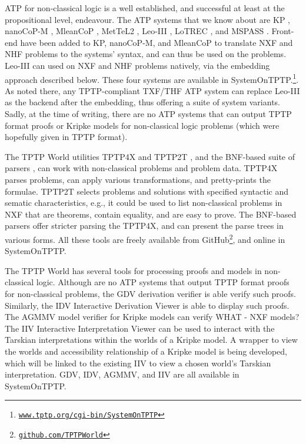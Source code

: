 \documentclass[runningheads]{llncs}
\begin{document}
ATP for non-classical logic is a well established, and successful at least at the propositional
level, endeavour.
The ATP systems that we know about are
K\raisebox{-3pt}{S}P \cite{NHD20,PN+21}, nanoCoP-M \cite{Ott21}, MleanCoP \cite{Ott14}, 
MetTeL2 \cite{TSK12}, Leo-III \cite{SB21}, LoTREC \cite{FF+01}, and MSPASS \cite{HS00-TABLEAUX}.
Front-end have been added to K\raisebox{-3pt}{S}P, nanoCoP-M, and MleanCoP to translate NXF
and NHF problems to the systems' syntax, and can thus be used on the problems.
Leo-III can used on NXF and NHF problems natively, via the embedding approach described below.
These four systems are available in SystemOnTPTP.\footnote{%
\href{https://www.tptp.org/cgi-bin/SystemOnTPTP}{\tt www.tptp.org/cgi-bin/SystemOnTPTP}}.
As noted there, any TPTP-compliant TXF/THF ATP system can replace Leo-III as the backend after
the embedding, thus offering a suite of system variants.
Sadly, at the time of writing, there are no ATP systems that can output TPTP format proofs or 
Kripke models for non-classical logic problems (which were hopefully given in TPTP format).

The TPTP World utilities TPTP4X and TPTP2T \cite{Sut07-CSR,Sut10}, and the BNF-based suite
of parsers \cite{VS06}, can work with non-classical problems and problem data.
TPTP4X parses problems, can apply various transformations, and pretty-prints the formulae.
TPTP2T selects problems and solutions with specified syntactic and sematic characteristics,
e.g., it could be used to list non-classical problems in NXF that are theorems, contain equality,
and are easy to prove.
The BNF-based parsers offer stricter parsing the TPTP4X, and can present the parse trees in
various forms.
All these tools are freely available from GitHub\footnote{%
\href{https://github.com/TPTPWorld}{\tt github.com/TPTPWorld}}, and online in SystemOnTPTP.

The TPTP World has several tools for processing proofs and models in non-classical logic.
Although are no ATP systems that output TPTP format proofs for non-classical problems, the
GDV derivation verifier \cite{Sut06} is able verify such proofs.
Similarly, the IDV Interactive Derivation Viewer \cite{TPS07} is able to display such proofs.
The AGMMV model verifier for Kripke models can verify WHAT - NXF models?
The IIV Interactive Interpretation Viewer \cite{MS23-Poster} can be used to interact with the
Tarskian interpretations within the worlds of a Kripke model. 
A wrapper to view the worlds and accessibility relationship of a Kripke model is being developed,
which will be linked to the existing IIV to view a chosen world's Tarskian interpretation.
GDV, IDV, AGMMV, and IIV are all available in SystemOnTPTP.
\end{document}
